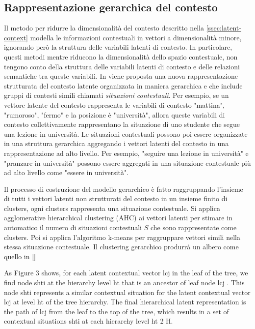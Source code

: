 \documentclass[12pt,italian]{report}
\begin{document}
\subsection{Rappresentazione gerarchica del contesto}
Il metodo per ridurre la dimensionalità del contesto descritto nella \autoref{ssec:latent-context} modella le informazioni contestuali in vettori a dimensionalità minore, ignorando però la struttura delle variabili latenti di contesto. In particolare, questi metodi mentre riducono la dimensionalità dello spazio contestuale, non tengono conto della struttura delle variabili latenti di contesto e delle relazioni semantiche tra queste variabili. In \cite{hierarchical-context} viene proposta una nuova rappresentazione strutturata del contesto latente organizzata in maniera gerarchica e che include gruppi di contesti simili chiamati \textit{situazioni contestuali}. Per esempio, se un vettore latente del contesto rappresenta le variabili di contesto "mattina", "rumoroso", "fermo" e la posizione è "università", allora queste variabili di contesto collettivamente rappresentano la situazione di uno studente che segue una lezione in università. Le situazioni contestuali possono poi essere organizzate in una struttura gerarchica aggregando i vettori latenti del contesto in una rappresentazione ad alto livello. Per esempio, "seguire una lezione in università" e "pranzare in università" possono essere aggregati in una situazione contestuale più ad alto livello come "essere in università".

Il processo di costruzione del modello gerarchico è fatto raggruppando l'insieme di tutti i vettori latenti non strutturati del contesto in un insieme finito di clusters, ogni clusters rappresenta una situazione contestuale. Si applica agglomerative hierarchical clustering (AHC) \cite{AHC} ai vettori latenti per stimare in automatico il numero di situazioni contestuali $S$ che sono rappresentate come clusters. Poi si applica l'algoritmo k-means per raggruppare vettori simili nella stessa situazione contestuale. Il clustering gerarchico produrrà un albero come quello in \autoref{}

As Figure 3 shows, for each latent contextual vector
lcj in the leaf of the tree, we find node shti at the hierarchy level ht
that is an ancestor of leaf node  lcj . This node shti represents
a similar contextual situation for the latent contextual vector lcj at level ht of the tree hierarchy. The final hierarchical
latent representation is the path of 
lcj from the leaf to the
top of the tree, which results in a set of contextual situations
shti at each hierarchy level ht 2 H.
\end{document}
